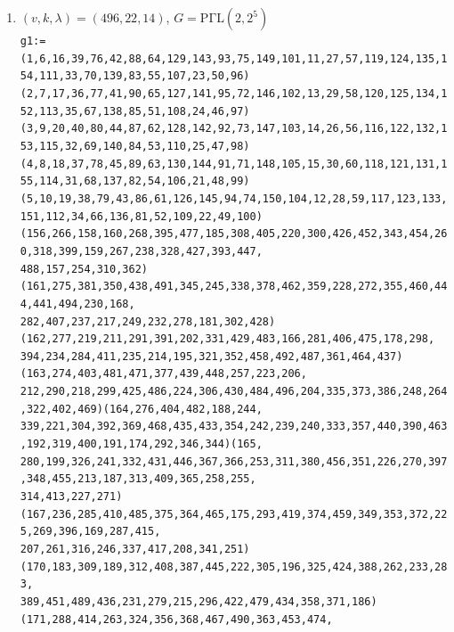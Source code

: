 \documentclass[a4paper,twopage,reqno,12pt]{amsart}
\theoremstyle{definition}
\numberwithin{equation}{section}
\newcommand{\PGaL}{\mathrm{P\Gamma L}}
\newcommand{\Aut}{\mathrm{Aut}}
\begin{document}
\begin{enumerate}
 \item\label{4962214} $(v,k,\lambda)=(496,22,14)$, $G=\PGaL(2,2^5)$\\
    {\tiny
\texttt{g1:=(1,6,16,39,76,42,88,64,129,143,93,75,149,101,11,27,57,119,124,135,154,111,33,70,139,83,55,107,23,50,96)\\
(2,7,17,36,77,41,90,65,127,141,95,72,146,102,13,29,58,120,125,134,152,113,35,67,138,85,51,108,24,46,97)\\
(3,9,20,40,80,44,87,62,128,142,92,73,147,103,14,26,56,116,122,132,153,115,32,69,140,84,53,110,25,47,98)\\
(4,8,18,37,78,45,89,63,130,144,91,71,148,105,15,30,60,118,121,131,155,114,31,68,137,82,54,106,21,48,99)\\
(5,10,19,38,79,43,86,61,126,145,94,74,150,104,12,28,59,117,123,133,151,112,34,66,136,81,52,109,22,49,100)\\
(156,266,158,160,268,395,477,185,308,405,220,300,426,452,343,454,260,318,399,159,267,238,328,427,393,447,\\
488,157,254,310,362)(161,275,381,350,438,491,345,245,338,378,462,359,228,272,355,460,444,441,494,230,168,\\
282,407,237,217,249,232,278,181,302,428)(162,277,219,211,291,391,202,331,429,483,166,281,406,475,178,298,\\
394,234,284,411,235,214,195,321,352,458,492,487,361,464,437)(163,274,403,481,471,377,439,448,257,223,206,\\
212,290,218,299,425,486,224,306,430,484,496,204,335,373,386,248,264,322,402,469)(164,276,404,482,188,244,\\
339,221,304,392,369,468,435,433,354,242,239,240,333,357,440,390,463,192,319,400,191,174,292,346,344)(165,\\
280,199,326,241,332,431,446,367,366,253,311,380,456,351,226,270,397,348,455,213,187,313,409,365,258,255,\\
314,413,227,271)(167,236,285,410,485,375,364,465,175,293,419,374,459,349,353,372,225,269,396,169,287,415,\\
207,261,316,246,337,417,208,341,251)(170,183,309,189,312,408,387,445,222,305,196,325,424,388,262,233,283,\\
389,451,489,436,231,279,215,296,422,479,434,358,371,186)(171,288,414,263,324,356,368,467,490,363,453,474,\\
}}
\end{enumerate}
\end{document}
